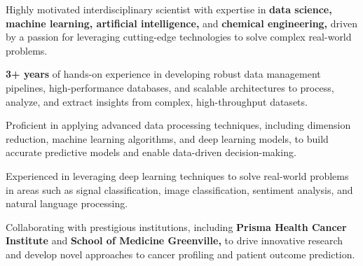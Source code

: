 

\begin{cvparagraph}
    \vspace{0.5cm}
    \begin{cvitemsfree}
        \item{Highly motivated interdisciplinary scientist with expertise in \textbf{data science, machine learning, artificial intelligence,} and \textbf{chemical engineering,} driven by a passion for leveraging cutting-edge technologies to solve complex real-world problems.}
        \item{\textbf{3+ years} of hands-on experience in developing robust data management pipelines, high-performance databases, and scalable architectures to process, analyze, and extract insights from complex, high-throughput datasets.}
        \item{Proficient in applying advanced data processing techniques, including dimension reduction, machine learning algorithms, and deep learning models, to build accurate predictive models and enable data-driven decision-making.}
        \item{Experienced in leveraging deep learning techniques to solve real-world problems in areas such as signal classification, image classification, sentiment analysis, and natural language processing.}
        \item{Collaborating with prestigious institutions, including \textbf{Prisma Health Cancer Institute} and \textbf{School of Medicine Greenville,} to drive innovative research and develop novel approaches to cancer profiling and patient outcome prediction.}
    \end{cvitemsfree}


\end{cvparagraph}
